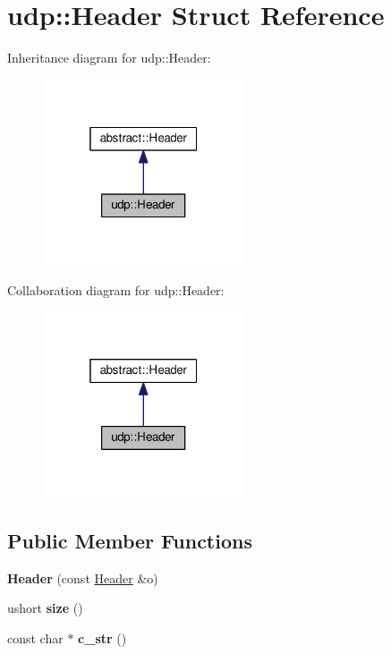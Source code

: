 \hypertarget{structudp_1_1Header}{}\section{udp\+:\+:Header Struct Reference}
\label{structudp_1_1Header}


Inheritance diagram for udp\+:\+:Header\+:\nopagebreak
\begin{figure}[H]
\begin{center}
\leavevmode
\includegraphics[width=169pt]{structudp_1_1Header__inherit__graph}
\end{center}
\end{figure}


Collaboration diagram for udp\+:\+:Header\+:\nopagebreak
\begin{figure}[H]
\begin{center}
\leavevmode
\includegraphics[width=169pt]{structudp_1_1Header__coll__graph}
\end{center}
\end{figure}
\subsection*{Public Member Functions}
\begin{DoxyCompactItemize}
\item 
{\bfseries Header} (const \hyperlink{structudp_1_1Header}{Header} \&o)\hypertarget{structudp_1_1Header_a4834b505432f80ca2eb9db6d51ab2c00}{}\label{structudp_1_1Header_a4834b505432f80ca2eb9db6d51ab2c00}

\item 
ushort {\bfseries size} ()\hypertarget{structudp_1_1Header_aeb0e9c82b2e6471758d8731ed590a502}{}\label{structudp_1_1Header_aeb0e9c82b2e6471758d8731ed590a502}

\item 
const char $\ast$ {\bfseries c\+\_\+str} ()\hypertarget{structudp_1_1Header_a9e39bb61a6c644edb6861f8fcb7b927d}{}\label{structudp_1_1Header_a9e39bb61a6c644edb6861f8fcb7b927d}

\end{DoxyCompactItemize}
